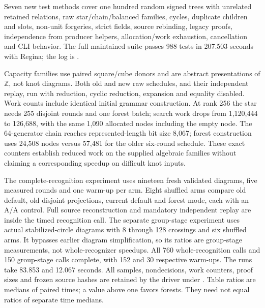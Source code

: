 Seven new test methods cover one hundred random signed trees with unrelated
retained relations, raw star/chain/balanced families, cycles, duplicate children
and slots, non-unit forgeries, strict fields, source rebinding, legacy proofs,
independence from producer helpers, allocation/work exhaustion, cancellation
and CLI behavior. The full maintained suite passes 988 tests in 207.503 seconds with Regina;
the log is .



Capacity families use paired square/cube donors and are abstract presentations
of $\mathbb Z$, not knot diagrams. Both old and new raw schedules, and their
independent replay, run with reduction, cyclic reduction, expansion and equality
disabled. Work counts include identical initial grammar construction. At rank
256 the star needs 255 disjoint rounds and one forest batch; search work drops
from 1,120,444 to 126,688, with the same 1,090 allocated nodes including the
empty node. The 64-generator chain reaches represented-length bit size 8,067;
forest construction uses 24,508 nodes versus 57,481 for the older six-round
schedule. These exact counters establish reduced work on the supplied algebraic
families without claiming a corresponding speedup on difficult knot inputs.




The complete-recognition experiment uses nineteen fresh validated diagrams,
five measured rounds and one warm-up per arm. Eight shuffled arms compare
old default, old disjoint projections, current default and forest mode, each
with an A/A control. Full source reconstruction and mandatory independent
replay are inside the timed recognition call. The separate group-stage
experiment uses actual stabilized-circle diagrams with 8 through 128 crossings
and six shuffled arms. It bypasses earlier diagram simplification, so its
ratios are group-stage measurements, not whole-recognizer speedups.
All 760 whole-recognition calls and 150 group-stage calls complete, with
152 and 30 respective warm-ups. The runs take 83.853 and 12.067 seconds.
All samples, nondecisions, work counters, proof sizes and frozen source hashes
are retained by the driver 
under . Table ratios are medians of paired times; a value
above one favors forests. They need not equal ratios of separate time medians.

